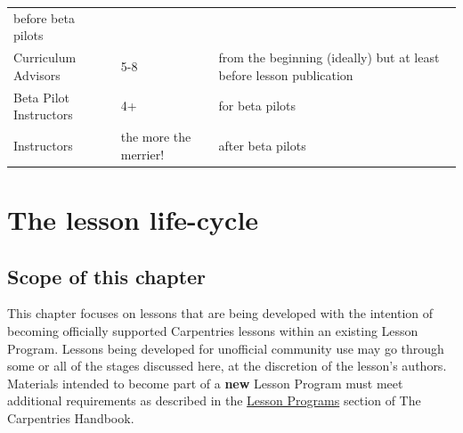 \documentclass[]{book}
\begin{document}
\begin{longtable}[]{@{}lll@{}}
\begin{minipage}[t]{0.33\columnwidth}
before beta pilots\strut
\end{minipage}\tabularnewline
\begin{minipage}[t]{0.18\columnwidth}\raggedright
Curriculum Advisors\strut
\end{minipage} & \begin{minipage}[t]{0.40\columnwidth}\raggedright
5-8\strut
\end{minipage} & \begin{minipage}[t]{0.33\columnwidth}\raggedright
from the beginning (ideally) but at least before lesson publication\strut
\end{minipage}\tabularnewline
\begin{minipage}[t]{0.18\columnwidth}\raggedright
Beta Pilot Instructors\strut
\end{minipage} & \begin{minipage}[t]{0.40\columnwidth}\raggedright
4+\strut
\end{minipage} & \begin{minipage}[t]{0.33\columnwidth}\raggedright
for beta pilots\strut
\end{minipage}\tabularnewline
\begin{minipage}[t]{0.18\columnwidth}\raggedright
Instructors\strut
\end{minipage} & \begin{minipage}[t]{0.40\columnwidth}\raggedright
the more the merrier!\strut
\end{minipage} & \begin{minipage}[t]{0.33\columnwidth}\raggedright
after beta pilots\strut
\end{minipage}\tabularnewline
\bottomrule
\end{longtable}

\hypertarget{the-lesson-life-cycle}{%
\chapter{The lesson life-cycle}\label{the-lesson-life-cycle}}

\hypertarget{scope-of-this-chapter}{%
\section{Scope of this chapter}\label{scope-of-this-chapter}}

This chapter focuses on lessons that are being developed
with the intention of becoming officially supported
Carpentries lessons within an existing Lesson Program.
Lessons being developed for unofficial community use
may go through some or all of the stages discussed here,
at the discretion of the lesson's authors. Materials
intended to become part of a \textbf{new} Lesson Program
must meet additional requirements as described in
the \href{https://docs.carpentries.org/topic_folders/governance/lesson-program-policy.html}{Lesson Programs} section of
The Carpentries Handbook.
\end{document}
